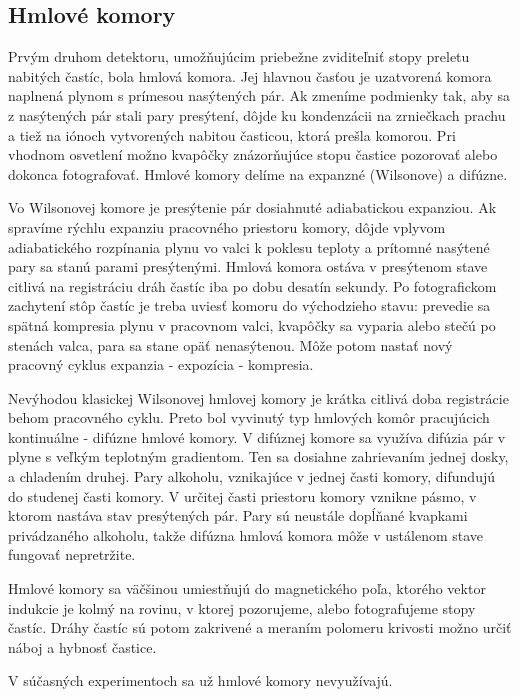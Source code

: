 \documentclass[../../main.tex]{subfiles}
\begin{document}
\subsection{Hmlové komory}

Prvým druhom detektoru, umožňujúcim priebežne zviditeľniť stopy preletu nabitých častíc, bola hmlová komora. Jej hlavnou časťou je uzatvorená komora naplnená plynom s prímesou nasýtených pár. Ak zmeníme podmienky tak, aby sa z nasýtených pár stali pary presýtení, dôjde ku kondenzácii na zrniečkach prachu a tiež na iónoch vytvorených nabitou časticou, ktorá prešla komorou. Pri vhodnom osvetlení možno kvapôčky znázorňujúce stopu častice pozorovať alebo dokonca fotografovať. Hmlové komory delíme na expanzné (Wilsonove) a difúzne.

Vo Wilsonovej komore je presýtenie pár dosiahnuté adiabatickou expanziou. Ak spravíme rýchlu expanziu pracovného priestoru komory, dôjde vplyvom adiabatického rozpínania plynu vo valci k poklesu teploty a prítomné nasýtené pary sa stanú parami presýtenými. Hmlová komora ostáva v presýtenom stave citlivá na registráciu dráh častíc iba po dobu desatín sekundy. Po fotografickom zachytení stôp častíc je treba uviesť komoru do východzieho stavu: prevedie sa spätná kompresia plynu v pracovnom valci, kvapôčky sa vyparia alebo stečú po stenách valca, para sa stane opäť nenasýtenou. Môže potom nastať nový pracovný cyklus expanzia - expozícia - kompresia.

Nevýhodou klasickej Wilsonovej hmlovej komory je krátka citlivá doba registrácie behom pracovného cyklu. Preto bol vyvinutý typ hmlových komôr pracujúcich kontinuálne - difúzne hmlové komory. V difúznej komore sa využíva difúzia pár v plyne s veľkým teplotným gradientom. Ten sa dosiahne zahrievaním jednej dosky, a chladením druhej. Pary alkoholu, vznikajúce v jednej časti komory, difundujú do studenej časti komory. V určitej časti priestoru komory vznikne pásmo, v ktorom nastáva stav presýtených pár. Pary sú neustále dopĺňané kvapkami privádzaného alkoholu, takže difúzna hmlová komora môže v ustálenom stave fungovať nepretržite.



Hmlové komory sa väčšinou umiestňujú do magnetického poľa, ktorého vektor indukcie je kolmý na rovinu, v ktorej pozorujeme, alebo fotografujeme stopy častíc. Dráhy častíc sú potom zakrivené a meraním polomeru krivosti možno určiť náboj a hybnosť častice.

V súčasných experimentoch sa už hmlové komory nevyužívajú.
\end{document}
